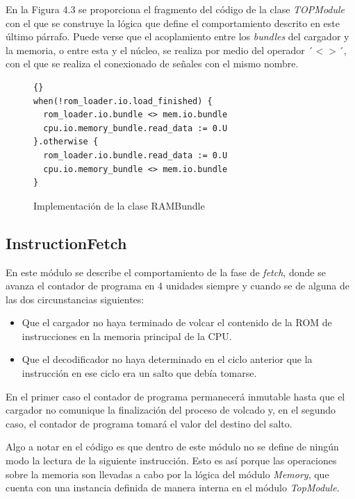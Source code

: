 En la Figura 4.3 se proporciona el fragmento del código de la clase \textit{TOPModule} con el que se construye la lógica que define el comportamiento descrito en este último párrafo. Puede verse que el acoplamiento entre los \textit{bundles} del cargador y la memoria, o entre esta y el núcleo, se realiza por medio del operador ´$<>$´, con el que se realiza el conexionado de señales con el mismo nombre.
\vspace{+0.3cm}
\begin{figure}[h]
\begin{lstlisting}[style=scalaStyle]{}
when(!rom_loader.io.load_finished) {
  rom_loader.io.bundle <> mem.io.bundle
  cpu.io.memory_bundle.read_data := 0.U
}.otherwise {
  rom_loader.io.bundle.read_data := 0.U
  cpu.io.memory_bundle <> mem.io.bundle
}
\end{lstlisting}
\caption{Implementación de la clase RAMBundle}
\end{figure}

\subsection{InstructionFetch}

En este módulo se describe el comportamiento de la fase de \textit{fetch}, donde se avanza el contador de programa en 4 unidades siempre y cuando se de alguna de las dos circunstancias siguientes:

\begin{itemize}
  \item Que el cargador no haya terminado de volcar el contenido de la ROM de instrucciones en la memoria principal de la CPU.
  \vspace{-0.2cm}
  \item Que el decodificador no haya determinado en el ciclo anterior que la instrucción en ese ciclo era un salto que debía tomarse.
\end{itemize}

En el primer caso el contador de programa permanecerá inmutable hasta que el cargador no comunique la finalización del proceso de volcado y, en el segundo caso, el contador de programa tomará el valor del destino del salto.

Algo a notar en el código es que dentro de este módulo no se define de ningún modo la lectura de la siguiente instrucción. Esto es así porque las operaciones sobre la memoria son llevadas a cabo por la lógica del módulo \textit{Memory}, que cuenta con una instancia definida de manera interna en el módulo \textit{TopModule}.

